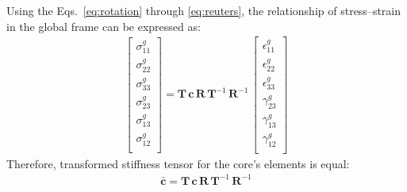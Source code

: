 \documentclass[materials,article,submit,moreauthors,pdftex]{Definitions/mdpi}
\begin{document}
Using the Eqs.~\ref{eq:rotation} through \ref{eq:reuters}, the relationship of stress--strain in the global frame can be expressed as:
\begin{eqnarray}
\left [
\begin{array}{c}
\sigma^g_{11}\\
\sigma^g_{22}\\ 
\sigma^g_{33}\\ 
\sigma^g_{23}\\
\sigma^g_{13}\\
\sigma^g_{12}\\
\end{array}
\right ]=
\textbf{T}\,\textbf{c}\,\textbf{R}\,\textbf{T}^{-1}\,\textbf{R}^{-1}\,
\left [
\begin{array}{c}
\epsilon^g_{11}\\
\epsilon^g_{22}\\ 
\epsilon^g_{33}\\
\gamma^g_{23}\\
\gamma^g_{13}\\
\gamma^g_{12}\\
\end{array}
\right ]
\label{eq:stress-strain}
\end{eqnarray}
Therefore, transformed stiffness tensor for the core's elements is equal:
\begin{eqnarray}
\bar{\textbf{c}}=\textbf{T}\,\textbf{c}\,\textbf{R}\,\textbf{T}^{-1}\,\textbf{R}^{-1}
\label{eq:c_global}
\end{eqnarray}
\end{document}
